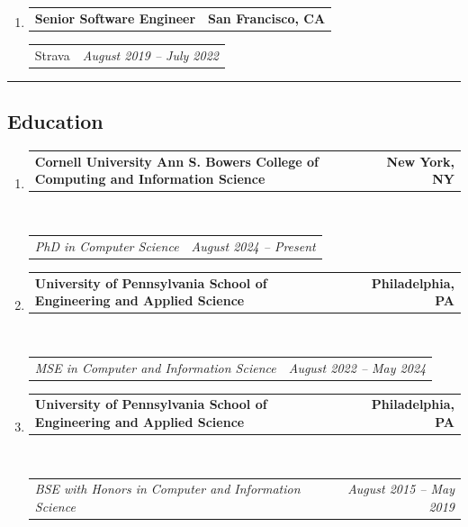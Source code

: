 \documentclass[letterpaper]{article}
\makeatletter
\newif\iflong
\newcommand*{\tabulardef}[3]{\begin{tabular}[t]{@{}lp{\dimexpr\linewidth-#1}@{}}
    #2&#3
\end{tabular}}
\newcommand{\headerrow}[2]
{\begin{tabular*}{\linewidth}{l@{\extracolsep{\fill}}r}
	#1 &
	#2 \\
\end{tabular*}}
\makeatother
\begin{document}
\begin{enumerate}[label=]
	\item
		\headerrow
			{\textbf{Senior Software Engineer}}
			{\textbf{San Francisco, CA}}
	\headerrow
		{Strava}
		{\emph{August 2019 -- July 2022}}
    \iflong
	\begin{enumerate}[label= *]
	\parskip=-0.1em
        \item \tabulardef{4cm}{}{Led platform-wide migration of core activities data model (1B+ records) into a centralized microservice to unlock new sport types (trail running, MTB, etc.)}
        \item \tabulardef{4cm}{}{Investigated malformed route data, identifying/fixing root causes and then shipping Apache Spark backfill job and request hooks to remediate affected data}
        \item \tabulardef{4cm}{}{Used Apache Kafka and Spark to build geospatial data pipeline powering Strava Metro, a platform used by transportation agencies worldwide for urban planning}
        \item \tabulardef{4cm}{}{Developed Scala microservice using Finatra, Apache Thrift, and Cassandra to serve millions of static map rendering requests across iOS, Android, and web}
	\end{enumerate}
    \fi
\end{enumerate}


\hrule

\subsection*{Education}
  
\begin{enumerate}[label=]
	\parskip=-0.05em
	\item
	\headerrow
        {\textbf{Cornell University Ann S. Bowers College of Computing and Information Science}}
		{\textbf{New York, NY}}
	\\
	\headerrow
		{\emph{PhD in Computer Science}}
        {\emph{August 2024 -- Present}}

	\item 
	\headerrow
		{\textbf{University of Pennsylvania School of Engineering and Applied Science}}
		{\textbf{Philadelphia, PA}}
	\\
	\headerrow
		{\emph{MSE in Computer and Information Science}}
		{\emph{August 2022 -- May 2024}}

	\item 
	\headerrow
		{\textbf{University of Pennsylvania School of Engineering and Applied Science}}
		{\textbf{Philadelphia, PA}}
	\\
	\headerrow
		{\emph{BSE with Honors in Computer and Information Science}}
		{\emph{August 2015 -- May 2019}}

\end{enumerate}
\end{document}
